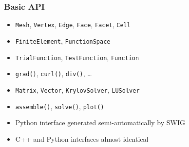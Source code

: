 \begin{frame}
  \frametitle{Basic API}

  \begin{itemize}
  \item
    \texttt{Mesh},
    \texttt{Vertex},
    \texttt{Edge},
    \texttt{Face},
    \texttt{Facet},
    \texttt{Cell}
  \item
    \texttt{FiniteElement}, \texttt{FunctionSpace}
  \item
    \texttt{TrialFunction},
    \texttt{TestFunction},
    \texttt{Function}
  \item
    \texttt{grad()}, \texttt{curl()}, \texttt{div()}, \ldots
  \item
    \texttt{Matrix}, \texttt{Vector}, \texttt{KrylovSolver}, \texttt{LUSolver}
  \item
    \texttt{assemble()}, \texttt{solve()}, \texttt{plot()}
  \end{itemize}

  \vspace{1cm}

  \begin{itemize}
  \item
    Python interface generated semi-automatically by SWIG
  \item
    C++ and Python interfaces almost identical
  \end{itemize}

\end{frame}
